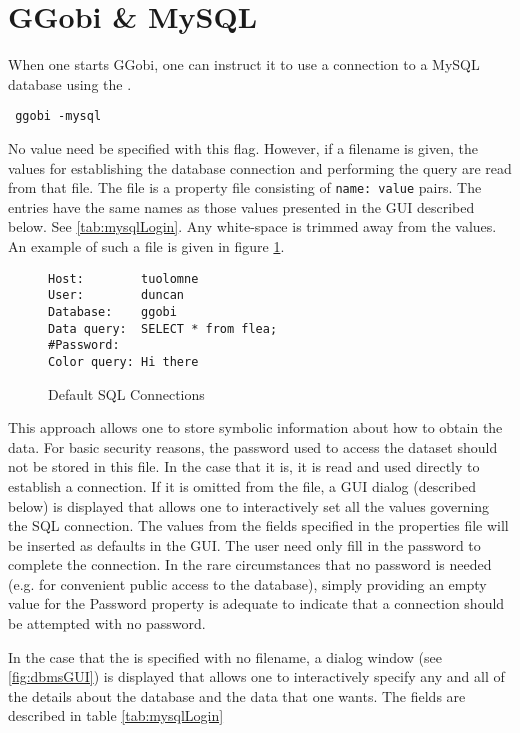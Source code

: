 \documentclass{article}
\begin{document}
\section{GGobi \& MySQL}
When one starts GGobi, one can instruct it
to use a connection to a MySQL database
using the .
\begin{verbatim}
 ggobi -mysql
\end{verbatim}
No value need be specified with this flag.  However, if a filename is given,
the values for establishing the database connection and performing the
query are read from that file.  The file is a property file consisting
of \texttt{name: value} pairs.  The entries have the same names as
those values presented in the GUI described below.  See
\ref{tab:mysqlLogin}.  Any white-space is trimmed away from the
values. An example of such a file is given
in figure \ref{fig:mysqlInputs}.
\begin{figure}[htbp]
  \begin{center}
    \leavevmode
\begin{verbatim}
Host:        tuolomne
User:        duncan
Database:    ggobi
Data query:  SELECT * from flea;
#Password: 
Color query: Hi there
\end{verbatim}    
    \caption{Default SQL Connections}
    \label{fig:mysqlInputs}
  \end{center}
\end{figure}



This approach allows one to store symbolic information about how to
obtain the data.  For basic security reasons, the password used to
access the dataset should not be stored in this file.  In the case
that it is, it is read and used directly to establish a connection.
If it is omitted from the file, a GUI dialog (described below) is
displayed that allows one to interactively set all the values
governing the SQL connection. The values from the fields specified in
the properties file will be inserted as defaults in the GUI.  The user
need only fill in the password to complete the connection.  In the
rare circumstances that no password is needed (e.g. for convenient
public access to the database), simply providing an empty value for
the Password property is adequate to indicate that a connection should
be attempted with no password.



In the case that the  is specified with no filename, a
dialog window (see \ref{fig:dbmsGUI}) is displayed that allows one to
interactively specify any and all of the details about the database
and the data that one wants.  The fields are described in table
\ref{tab:mysqlLogin}
\end{document}

